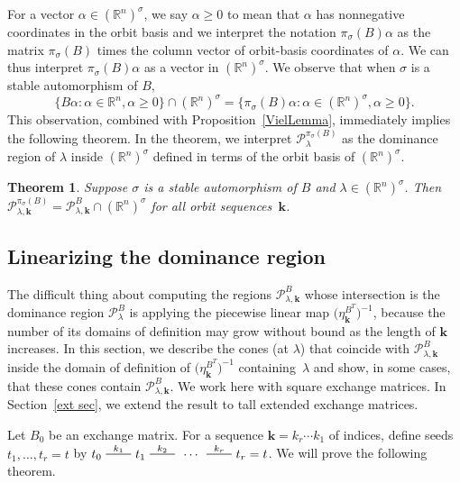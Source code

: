 \documentclass{amsart}
\newtheorem{theorem}[proposition]{Theorem}
\theoremstyle{definition}
\theoremstyle{remark}
\numberwithin{equation}{section}
\newcommand{\reals}{\mathbb R}
\newcommand{\edge}{\,\,\rule[2.7pt]{20pt}{0.5pt}\,\,}
\newcommand{\sett}[1]{{\bigl\lbrace #1 \bigr\rbrace}}
\newcommand{\0}{{\mathbf{0}}}
\newcommand{\g}{\mathbf{g}}
\newcommand{\kk}{{\boldsymbol{k}}}
\renewcommand{\P}{\mathcal{P}}
\begin{document}
For a vector $\alpha\in(\reals^n)^\sigma$, we say $\alpha\ge0$ to mean that $\alpha$ has nonnegative coordinates in the orbit basis and we interpret the notation $\pi_\sigma(B)\alpha$ as the matrix $\pi_\sigma(B)$ times the column vector of orbit-basis coordinates of $\alpha$.
We can thus interpret $\pi_\sigma(B)\alpha$ as a vector in $(\reals^n)^\sigma$.
We observe that when $\sigma$ is a stable automorphism of $B$,
\[\sett{B\alpha:\alpha\in\reals^n,\alpha\ge0}\cap(\reals^n)^\sigma=\sett{\pi_\sigma(B)\alpha:\alpha\in(\reals^n)^\sigma,\alpha\ge0}.\]
This observation, combined with Proposition~\ref{VielLemma}, immediately implies the following theorem.
In the theorem, we interpret $\P_\lambda^{\pi_\sigma(B)}$ as the dominance region of $\lambda$ inside $(\reals^n)^\sigma$ defined in terms of the orbit basis of $(\reals^n)^\sigma$.
\begin{theorem}\label{fold dom reg}
Suppose $\sigma$ is a stable automorphism of $B$ and $\lambda\in(\reals^n)^\sigma$.
Then $\P_{\lambda,\kk}^{\pi_\sigma(B)}=\P_{\lambda,\kk}^B\cap(\reals^n)^\sigma$ for all orbit sequences~$\kk$.
\end{theorem}




\subsection{Linearizing the dominance region}\label{lin sec}
The difficult thing about computing the regions $\P^B_{\lambda,\kk}$ whose intersection is the dominance region $\P^B_\lambda$ is applying the piecewise linear map $\bigl(\eta^{B^T}_\kk\bigr)^{-1}$, because the number of its domains of definition may grow without bound as the length of $\kk$ increases.
In this section, we describe the cones (at $\lambda$) that coincide with $\P^B_{\lambda,\kk}$ inside the domain of definition of $\bigl(\eta^{B^T}_\kk\bigr)^{-1}$ containing~$\lambda$ and show, in some cases, that these cones contain $\P^B_{\lambda,\kk}$.
We work here with square exchange matrices.
In Section~\ref{ext sec}, we extend the result to tall extended exchange matrices.

Let $B_0$ be an exchange matrix.
For a sequence $\kk=k_r\cdots k_1$ of indices, define seeds $t_1,\ldots,t_r=t$ by $t_0\overset{k_1}{\edge}t_1\overset{k_2}{\edge}\,\cdots\,\overset{k_r}{\edge}t_r=t$.
We will prove the following theorem.
\end{document}
